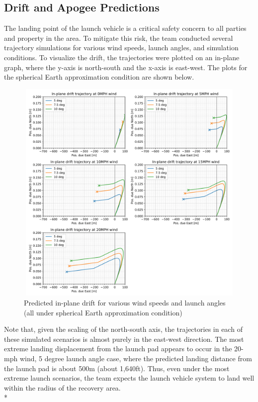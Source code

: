 \subsection{Drift and Apogee Predictions}
The landing point of the launch vehicle is a critical safety concern to all parties and property in the area. To mitigate this risk, the team conducted several trajectory simulations for various wind speeds, launch angles, and simulation conditions. To visualize the drift, the trajectories were plotted on an in-plane graph, where the y-axis is north-south and the x-axis is east-west. The plots for the spherical Earth approximation condition are shown below.
\FloatBarrier
\begin{figure}[h]
    \centering
    \includegraphics[width = 15cm, height = 11cm]{img/FIDO/InPlaneDrift-1.png}
    \caption{Predicted in-plane drift for various wind speeds and launch angles (all under spherical Earth approximation condition)}
    \label{fig:my_label}
\end{figure}
Note that, given the scaling of the north-south axis, the trajectories in each of these simulated scenarios is almost purely in the east-west direction. The most extreme landing displacement from the launch pad appears to occur in the 20-mph wind, 5 degree launch angle case, where the predicted landing distance from the launch pad is about 500m (about 1,640ft). Thus, even under the most extreme launch scenarios, the team expects the launch vehicle system to land well within the radius of the recovery area.
\\*
